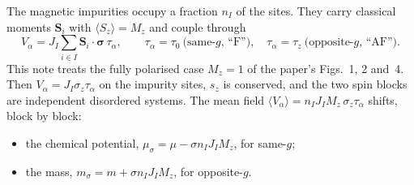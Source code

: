 \documentclass[11pt,a4paper]{article}
\begin{document}
The magnetic impurities occupy a fraction $n_I$ of the sites. They carry classical moments
$\bm S_i$ with $\langle S_z\rangle = M_z$ and couple through
\begin{equation}
V_\alpha = J_I \sum_{i\in I} \bm S_i\cdot\bm\sigma\,\tau_\alpha ,\qquad
\tau_\alpha = \tau_0\ \text{(same-$g$, ``F'')},\quad \tau_\alpha=\tau_z\ \text{(opposite-$g$, ``AF'')}.
\label{e:V}
\end{equation}
This note treats the fully polarised case $M_z=1$ of the paper's Figs.~1, 2 and~4. Then
$V_\alpha = J_I\sigma_z\tau_\alpha$ on the impurity sites, $s_z$ is conserved, and the two spin blocks
are independent disordered systems. The mean field $\langle V_\alpha\rangle = n_I J_I M_z\,\sigma_z\tau_\alpha$
shifts, block by block:
\begin{itemize}
\item the chemical potential, $\mu_\sigma = \mu - \sigma n_I J_I M_z$, for same-$g$;
\item the mass, $m_\sigma = m + \sigma n_I J_I M_z$, for opposite-$g$.
\end{itemize}
\end{document}
